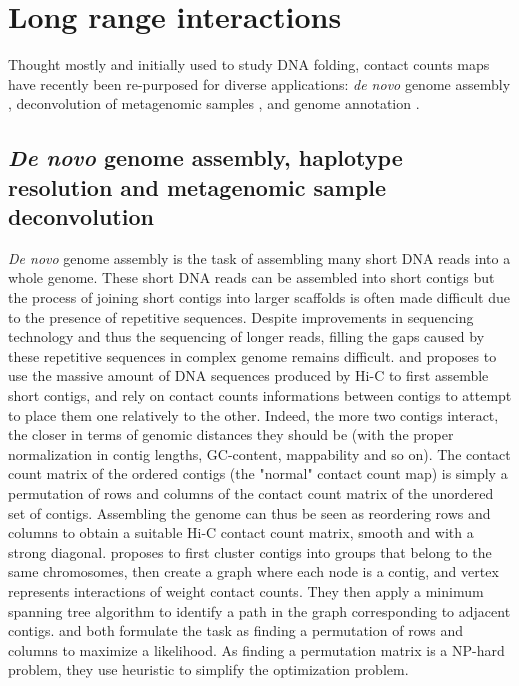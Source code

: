 \section{Long range interactions}


Thought mostly and initially used to study DNA folding, contact counts maps
have recently been re-purposed for diverse applications: \textit{de novo}
genome assembly \citep{burton:chromosome, kaplan:high-throughput},
deconvolution of metagenomic samples \citep{burton:species-level,
beitel:strain}, and genome annotation \citep{marie-nelly:filling,
varoquaux:accurate}.

\subsection{\textit{De novo} genome assembly, haplotype resolution and
metagenomic sample deconvolution}

\textit{De novo} genome assembly is the task of assembling many short DNA
reads into a whole genome. These short DNA reads can be assembled into short
contigs but the process of joining short contigs into larger scaffolds is
often made difficult due to the presence of repetitive sequences. Despite
improvements in sequencing technology and thus the sequencing of longer reads,
filling the gaps caused by these repetitive sequences in complex genome
remains difficult. \citet{burton:chromosome} and
\citet{kaplan:high-throughput} proposes to use the massive amount of DNA
sequences produced by Hi-C to first assemble short contigs, and rely on
contact counts informations between contigs to attempt to place them one
relatively to the other. Indeed, the more two contigs interact, the closer in
terms of genomic distances they should be (with the proper normalization in
contig lengths, GC-content, mappability and so on). The contact count matrix
of the ordered contigs (the "normal" contact count map) is simply a
permutation of rows and columns of the contact count matrix of the unordered
set of contigs. Assembling the genome can thus be seen as reordering rows and
columns to obtain a suitable Hi-C contact count matrix, smooth and with a
strong diagonal. \citet{burton:chromosome} proposes to first cluster contigs
into groups that belong to the same chromosomes, then create a graph where
each node is a contig, and vertex represents interactions of weight contact
counts. They then apply a minimum spanning tree algorithm to identify a path
in the graph corresponding to adjacent contigs. \citet{kaplan:high-throughput}
and \citet{marie-nelly:high-quality} both formulate the task as finding a
permutation of rows and columns to maximize a likelihood. As finding a
permutation matrix is a NP-hard problem, they use heuristic to simplify the
optimization problem.

